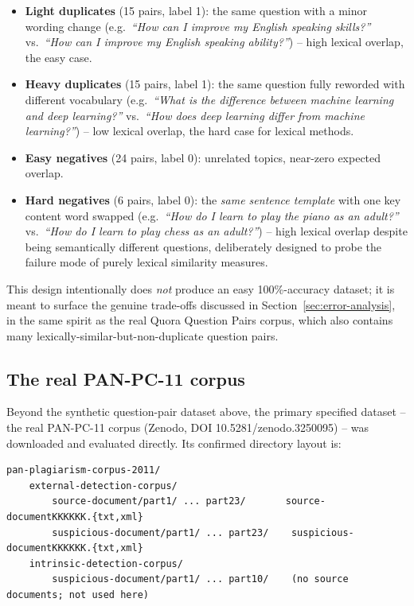 \documentclass[11pt]{article}
\begin{document}
\begin{itemize}
    \item \textbf{Light duplicates} (15 pairs, label 1): the same question with a minor wording change
          (e.g.\ \emph{``How can I improve my English speaking skills?''} vs.\ \emph{``How can I improve
          my English speaking ability?''}) -- high lexical overlap, the easy case.
    \item \textbf{Heavy duplicates} (15 pairs, label 1): the same question fully reworded with different
          vocabulary (e.g.\ \emph{``What is the difference between machine learning and deep learning?''}
          vs.\ \emph{``How does deep learning differ from machine learning?''}) -- low lexical overlap,
          the hard case for lexical methods.
    \item \textbf{Easy negatives} (24 pairs, label 0): unrelated topics, near-zero expected overlap.
    \item \textbf{Hard negatives} (6 pairs, label 0): the \emph{same sentence template} with one key
          content word swapped (e.g.\ \emph{``How do I learn to play the piano as an adult?''} vs.\
          \emph{``How do I learn to play chess as an adult?''}) -- high lexical overlap despite being
          semantically different questions, deliberately designed to probe the failure mode of purely
          lexical similarity measures.
\end{itemize}

This design intentionally does \emph{not} produce an easy 100\%-accuracy dataset; it is meant to surface
the genuine trade-offs discussed in Section~\ref{sec:error-analysis}, in the same spirit as the real Quora
Question Pairs corpus, which also contains many lexically-similar-but-non-duplicate question pairs.

\subsection{The real PAN-PC-11 corpus}
\label{sec:pan-pc11-dataset}

Beyond the synthetic question-pair dataset above, the primary specified dataset -- the real PAN-PC-11
corpus (Zenodo, DOI 10.5281/zenodo.3250095) -- was downloaded and evaluated directly. Its confirmed
directory layout is:

\begin{lstlisting}
pan-plagiarism-corpus-2011/
    external-detection-corpus/
        source-document/part1/ ... part23/       source-documentKKKKKK.{txt,xml}
        suspicious-document/part1/ ... part23/    suspicious-documentKKKKKK.{txt,xml}
    intrinsic-detection-corpus/
        suspicious-document/part1/ ... part10/    (no source documents; not used here)
\end{lstlisting}
\end{document}
